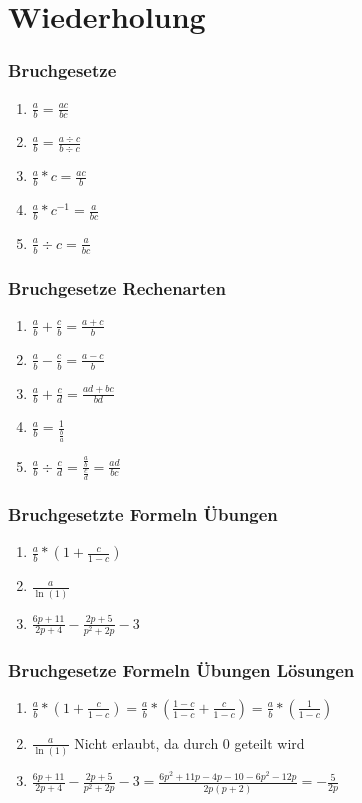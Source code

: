 \section{Wiederholung}
\begin{frame}
    \frametitle{Bruchgesetze}
    \begin{enumerate}
        \vfill \item $\frac{a}{b}=\frac{ac}{bc}$
        \vfill \item $\frac{a}{b}=\frac{a \div c}{b \div c}$
        \vfill \item $\frac{a}{b}*c=\frac{ac}{b}$
        \vfill \item $\frac{a}{b}*c^{-1}=\frac{a}{bc}$
        \vfill \item $\frac{a}{b} \div c=\frac{a}{bc}$
    \end{enumerate}
\end{frame}

\begin{frame}
    \frametitle{Bruchgesetze Rechenarten}
    \begin{enumerate}
        \vfill \item $\frac{a}{b} + \frac{c}{b}=\frac{a+c}{b}$
        \vfill \item $\frac{a}{b} - \frac{c}{b}=\frac{a-c}{b}$
        \vfill \item $\frac{a}{b} + \frac{c}{d}=\frac{ad+bc}{bd}$
        \vfill \item $\frac{a}{b} = \frac{1}{\frac{b}{a}}$
        \vfill \item $\frac{a}{b} \div \frac{c}{d} = \frac{\frac{a}{b}}{\frac{c}{d}} = \frac{ad}{bc}$
    \end{enumerate}
\end{frame}


\begin{frame}
    \frametitle{Bruchgesetzte Formeln Übungen}
    \begin{enumerate}
	\vfill \item $\frac{a}{b} * (1 + \frac{c}{1-c})$
        \vfill \item $\frac{a}{\ln(1)}$
        \vfill \item $\frac{6p + 11}{2p + 4} - \frac{2p + 5}{p^2 +2p} -3$
    \end{enumerate}
\end{frame}

\begin{frame}
    \frametitle{Bruchgesetze Formeln Übungen Lösungen}
    \begin{enumerate}
	\vfill \item $\frac{a}{b} * (1 + \frac{c}{1-c}) = \frac{a}{b}*(\frac{1-c}{1-c}+\frac{c}{1-c}) = \frac{a}{b}*(\frac{1}{1-c})$
        \vfill \item $\frac{a}{\ln(1)}$ Nicht erlaubt, da durch 0 geteilt wird
	\vfill \item $\frac{6p + 11}{2p + 4} - \frac{2p + 5}{p^2 +2p} -3 = \frac{6p^2+11p-4p-10-6p^2-12p}{2p(p+2)} = -\frac{5}{2p}$
    \end{enumerate}
\end{frame}

